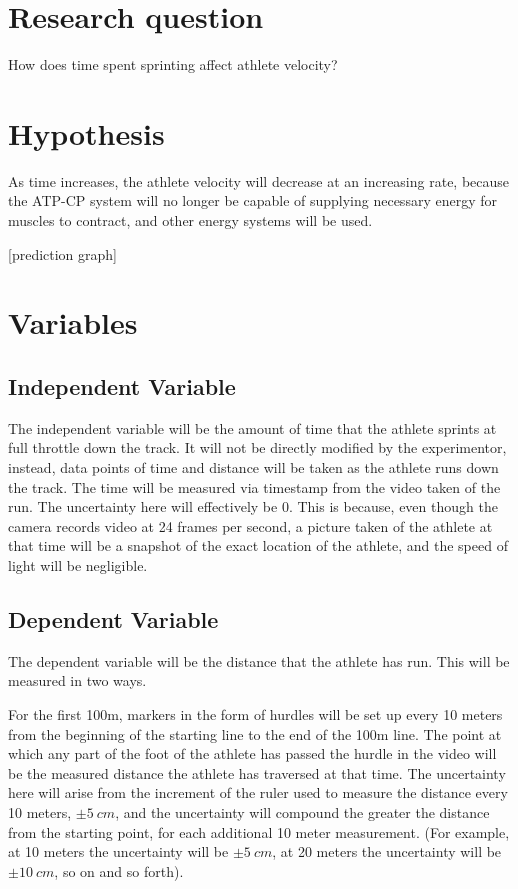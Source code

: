 \documentclass[index]{subfiles}
\begin{document}
\section{Research question}
How does time spent sprinting affect athlete velocity?

\section{Hypothesis}
As time increases, the athlete velocity will decrease at an increasing rate, because the ATP-CP system will no longer be capable of supplying necessary energy for muscles to contract, and other energy systems will be used.

    [prediction graph]

\section{Variables}
\subsection{Independent Variable}
The independent variable will be the amount of time that the athlete sprints at full throttle down the track. It will not be directly modified by the experimentor, instead, data points of time and distance will be taken as the athlete runs down the track. The time will be measured via timestamp from the video taken of the run. The uncertainty here will effectively be 0. This is because, even though the camera records video at 24 frames per second, a picture taken of the athlete at that time will be a snapshot of the exact location of the athlete, and the speed of light will be negligible.

\subsection{Dependent Variable}
The dependent variable will be the distance that the athlete has run. This will be measured in two ways.

For the first 100m, markers in the form of hurdles will be set up every 10 meters from the beginning of the starting line to the end of the 100m line. The point at which any part of the foot of the athlete has passed the hurdle in the video will be the measured distance the athlete has traversed at that time. The uncertainty here will arise from the increment of the ruler used to measure the distance every 10 meters, $\pm5\ cm$, and the uncertainty will compound the greater the distance from the starting point, for each additional 10 meter measurement. (For example, at 10 meters the uncertainty will be $\pm5\ cm$, at 20 meters the uncertainty will be $\pm10\ cm$, so on and so forth).
\end{document}
